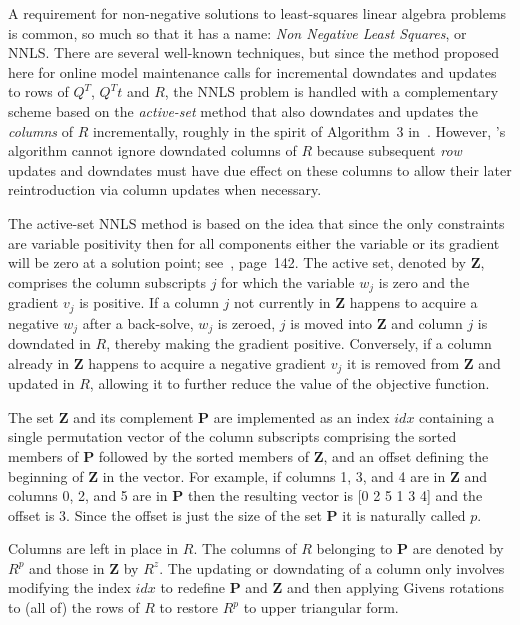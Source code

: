 A requirement for non-negative solutions to least-squares linear algebra problems is common,
so much so that it has a name: \emph{Non Negative Least Squares}, or NNLS.
There are several well-known techniques\cite{ChPl},
but since the method proposed here for online model maintenance calls for
incremental downdates and updates to rows of $Q^T$, $Q^Tt$ and $R$,
the NNLS problem is handled with a complementary scheme
based on the \emph{active-set} method\cite{LaHa} that
also downdates and updates the \emph{columns} of $R$ incrementally,
roughly in the spirit of Algorithm~3 in~\cite{LuDu}.
However, \pacora's algorithm cannot ignore downdated columns of $R$
because subsequent \emph{row} updates and downdates must have due effect
on these columns to allow their later reintroduction via column updates when necessary.

The active-set NNLS method is based on the idea that since the only constraints are variable positivity
then for all components either the variable or its gradient will be zero at a solution point; see~\cite{BoVa}, page~142.
The active set, denoted by \textbf{Z}, comprises the column subscripts $j$ for which the variable $w_j$ is zero and the gradient $v_j$ is positive.
If a column $j$ not currently in \textbf{Z} happens to acquire a negative $w_j$ after a back-solve, $w_j$ is zeroed,
$j$ is moved into \textbf{Z} and column $j$ is downdated in $R$, thereby making the gradient positive.
Conversely, if a column already in \textbf{Z} happens to acquire a negative gradient $v_j$ it is removed from \textbf{Z} and updated in $R$,
allowing it to further reduce the value of the objective function.

The set \textbf{Z} and its complement \textbf{P} are implemented as an index $idx$
containing a single permutation vector of the column subscripts comprising
the sorted members of \textbf{P} followed by the sorted members of \textbf{Z},
and an offset defining the beginning of \textbf{Z} in the vector.
For example, if columns 1, 3, and 4 are in \textbf{Z} and columns 0, 2, and 5 are in \textbf{P}
then the resulting vector is [0 2 5 1 3 4] and the offset is 3.
Since the offset is just the size of the set \textbf{P} it is naturally called $p$.

Columns are left in place in $R$. The columns of $R$ belonging to \textbf{P} are denoted by $R^p$ and those in \textbf{Z} by $R^z$.
The updating or downdating of a column only involves modifying the index $idx$ to redefine \textbf{P} and \textbf{Z} and then
applying Givens rotations to (all of) the rows of $R$ to restore $R^p$ to upper triangular form. 

